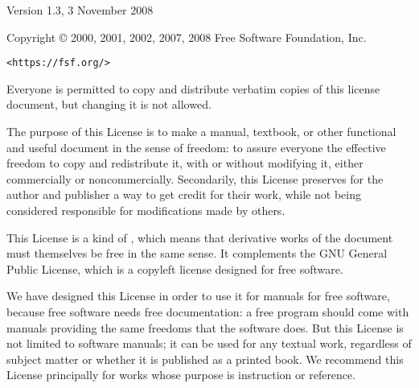 \starttitle
  [title=GNU Free Documentation License]


\setupnotation
  [footnote]
  [numberconversion=n]

\setupheadertexts
  []
  [\tfx\pagenumber]

\startalignment [middle]

       Version 1.3, 3 November 2008


 Copyright \copyright{} 2000, 2001, 2002, 2007, 2008  Free Software Foundation, Inc.

 \bigskip

     {\tt <https://fsf.org/>}

 \bigskip

 Everyone is permitted to copy and distribute verbatim copies
 of this license document, but changing it is not allowed.
\stopalignment


\stopalignment

The purpose of this License is to make a manual, textbook, or other
functional and useful document  in the sense of freedom: to
assure everyone the effective freedom to copy and redistribute it,
with or without modifying it, either commercially or noncommercially.
Secondarily, this License preserves for the author and publisher a way
to get credit for their work, while not being considered responsible
for modifications made by others.

This License is a kind of , which means that derivative
works of the document must themselves be free in the same sense.  It
complements the GNU General Public License, which is a copyleft
license designed for free software.

We have designed this License in order to use it for manuals for free
software, because free software needs free documentation: a free
program should come with manuals providing the same freedoms that the
software does.  But this License is not limited to software manuals;
it can be used for any textual work, regardless of subject matter or
whether it is published as a printed book.  We recommend this License
principally for works whose purpose is instruction or reference.


